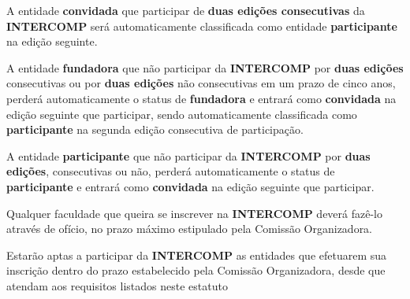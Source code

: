 \begin{article}
	\begin{xparagraph}
		A entidade \textbf{convidada} que participar de \textbf{duas edições consecutivas} da \textbf{INTERCOMP} será automaticamente classificada como entidade \textbf{participante} na edição seguinte.
	\end{xparagraph}

	\begin{xparagraph}
		A entidade \textbf{fundadora} que não participar da \textbf{INTERCOMP} por \textbf{duas edições} consecutivas ou por \textbf{duas edições} não consecutivas em um prazo de cinco anos, perderá automaticamente o status de \textbf{fundadora} e entrará como \textbf{convidada} na edição seguinte que participar, sendo automaticamente classificada como \textbf{participante} na segunda edição consecutiva de participação.
	\end{xparagraph}

	\begin{xparagraph}
		A entidade \textbf{participante} que não participar da \textbf{INTERCOMP} por \textbf{duas edições}, consecutivas ou não, perderá automaticamente o status de \textbf{participante} e entrará como \textbf{convidada} na edição seguinte que participar.
	\end{xparagraph}
\end{article}

\begin{article}
	Qualquer faculdade que queira se inscrever na \textbf{INTERCOMP} deverá fazê-lo através de ofício, no prazo máximo estipulado pela Comissão Organizadora.
\end{article}

\begin{article}
	Estarão aptas a participar da \textbf{INTERCOMP} as entidades que efetuarem sua inscrição dentro do prazo estabelecido pela Comissão Organizadora, desde que atendam aos requisitos listados neste estatuto
\end{article}
